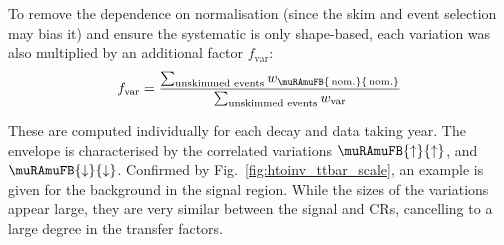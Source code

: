 \medskip

\noindent{}To remove the dependence on normalisation (since the skim and event selection may bias it) and ensure the systematic is only shape-based, each variation was also multiplied by an additional factor $f_{\mathrm{var}}$:
\begin{equation}
    f_{\mathrm{var}} = \dfrac{ \sum_{\text{unskimmed events}} w_{\muRAmuFB{\, \mathrm{nom.}}{\, \mathrm{nom.}}} }{ \sum_{\text{unskimmed events}} w_{\mathrm{var}} }
    \label{eq:ttbar_scale_fvar}
\end{equation}

These are computed individually for each decay and data taking year. The envelope is characterised by the correlated variations $\muRAmuFB{\uparrow}{\uparrow}$, and $\muRAmuFB{\downarrow}{\downarrow}$. Confirmed by Fig.~\ref{fig:htoinv_ttbar_scale}, an example is given for the \ttbar background in the signal region. While the sizes of the variations appear large, they are very similar between the signal and \glspl{CR}, cancelling to a large degree in the transfer factors.

